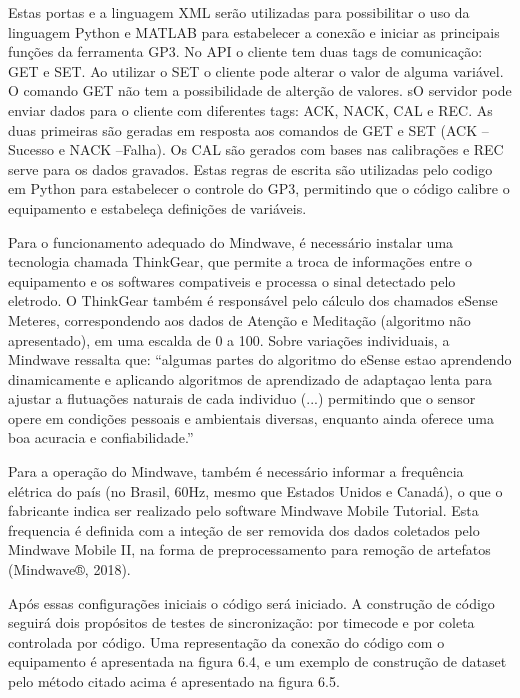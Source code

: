 Estas portas e a linguagem XML serão utilizadas para possibilitar o uso da linguagem Python e MATLAB para estabelecer a conexão e iniciar as principais funções da ferramenta GP3. No API o cliente tem duas tags de comunicação: GET e SET. Ao utilizar o SET o cliente pode alterar o valor de alguma variável. O comando GET não tem a possibilidade de alterção de valores. sO servidor pode enviar dados para o cliente com diferentes tags: ACK, NACK, CAL e REC. As duas primeiras são geradas em resposta aos comandos de GET e SET (ACK – Sucesso e NACK –Falha). Os CAL são gerados com bases nas calibrações e REC serve para os dados gravados. Estas regras de escrita são utilizadas pelo codigo em Python para estabelecer o controle do GP3, permitindo que o código calibre o equipamento e estabeleça definições de variáveis.

Para o funcionamento adequado do Mindwave, é necessário instalar uma tecnologia chamada ThinkGear, que permite a troca de informações entre o equipamento e os softwares compativeis e processa o sinal detectado pelo eletrodo. O ThinkGear também é responsável pelo cálculo dos chamados eSense Meteres, correspondendo aos dados de Atenção e Meditação (algoritmo não apresentado), em uma escalda de 0 a 100. Sobre variações individuais, a Mindwave ressalta que: “algumas partes do algoritmo do eSense estao aprendendo dinamicamente e aplicando algoritmos de aprendizado de adaptaçao lenta para ajustar a flutuações naturais de cada individuo (...) permitindo que o sensor opere em condições pessoais e ambientais diversas, enquanto ainda oferece uma boa acuracia e confiabilidade.”

Para a operação do Mindwave, também é necessário informar a frequência elétrica do país (no Brasil, 60Hz, mesmo que Estados Unidos e Canadá), o que o fabricante indica ser realizado pelo software Mindwave Mobile Tutorial. Esta frequencia é definida com a inteção de ser removida dos dados coletados pelo Mindwave Mobile II, na forma de preprocessamento para remoção de artefatos (Mindwave®, 2018). 

Após essas configurações iniciais o código será iniciado. A construção de código seguirá dois propósitos de testes de sincronização: por timecode e por coleta controlada por código. Uma representação da conexão do código com o equipamento é apresentada na figura 6.4, e um exemplo de construção de dataset pelo método citado acima é apresentado na figura 6.5. 



\subsection{}